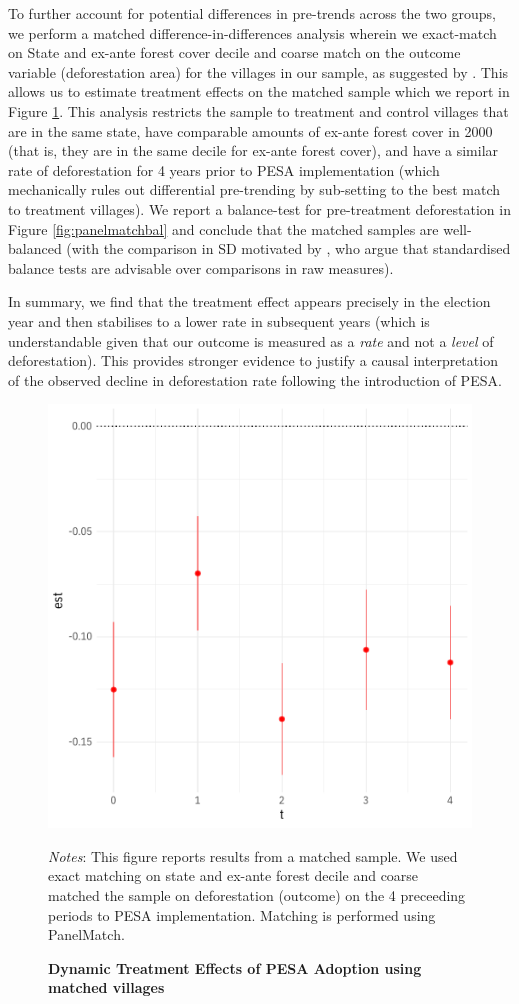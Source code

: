 \documentclass[12pt,reqno]{article}
\begin{document}
To further account for potential differences in pre-trends across the two groups, we perform a matched difference-in-differences analysis wherein we exact-match on State and ex-ante forest cover decile and coarse match on the outcome variable (deforestation area) for the villages in our sample, as suggested by \textcite[]{Imai2019-kp}. This allows us to estimate treatment effects on the matched sample which we report in Figure \ref{fig:panelmatch}. This analysis restricts the sample to treatment and control villages that are in the same state, have comparable amounts of ex-ante forest cover in 2000 (that is, they are in the same decile for ex-ante forest cover), and have a similar rate of deforestation for 4 years prior to PESA implementation (which mechanically rules out differential pre-trending by sub-setting to the best match to treatment villages). We report a balance-test for pre-treatment deforestation in Figure \ref{fig:panelmatchbal} and conclude that the matched samples are well-balanced (with the comparison in SD motivated by \textcite[]{imbens2015causal}, who argue that standardised balance tests are advisable over comparisons in raw measures).

In summary, we find that the treatment effect appears precisely in the election year and then stabilises to a lower rate in subsequent years (which is understandable given that our outcome is measured as a \emph{rate} and not a \emph{level} of deforestation). This provides stronger evidence to justify a causal interpretation of the observed decline in deforestation rate following the introduction of PESA. 


\begin{figure}[htbp!]
\begin{center}
\begin{minipage}{1 \linewidth}
  \caption{\textbf{Dynamic Treatment Effects of PESA Adoption using matched villages}}
  \label{fig:panelmatch}	
\centerline{\includegraphics[width=3 in,angle=0]{Output/panelmatch_fig.pdf}}
\smallskip
\scriptsize
\emph{Notes}: This figure reports results from a matched sample. We used exact matching on state and ex-ante forest decile and coarse matched the sample on deforestation (outcome) on the 4 preceeding periods to PESA implementation. Matching is performed using PanelMatch.
\end{minipage}
\end{center}
\end{figure}
\end{document}
